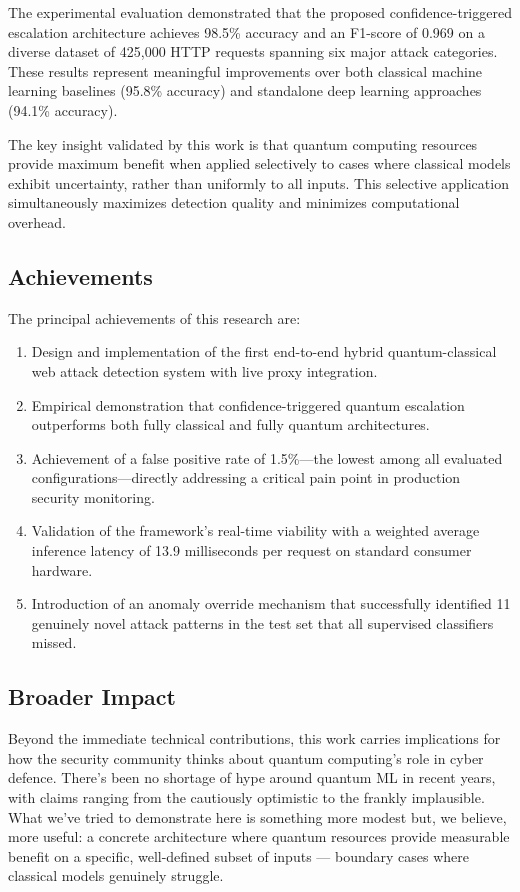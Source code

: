 \documentclass[journal,onecolumn]{IEEEtran}
\begin{document}
The experimental evaluation demonstrated that the proposed confidence-triggered escalation architecture achieves 98.5\% accuracy and an F1-score of 0.969 on a diverse dataset of 425,000 HTTP requests spanning six major attack categories. These results represent meaningful improvements over both classical machine learning baselines (95.8\% accuracy) and standalone deep learning approaches (94.1\% accuracy).

The key insight validated by this work is that quantum computing resources provide maximum benefit when applied selectively to cases where classical models exhibit uncertainty, rather than uniformly to all inputs. This selective application simultaneously maximizes detection quality and minimizes computational overhead.

\subsection{Achievements}
The principal achievements of this research are:

\begin{enumerate}
\item[(a)] Design and implementation of the first end-to-end hybrid quantum-classical web attack detection system with live proxy integration.

\item[(b)] Empirical demonstration that confidence-triggered quantum escalation outperforms both fully classical and fully quantum architectures.

\item[(c)] Achievement of a false positive rate of 1.5\%---the lowest among all evaluated configurations---directly addressing a critical pain point in production security monitoring.

\item[(d)] Validation of the framework's real-time viability with a weighted average inference latency of 13.9 milliseconds per request on standard consumer hardware.

\item[(e)] Introduction of an anomaly override mechanism that successfully identified 11 genuinely novel attack patterns in the test set that all supervised classifiers missed.
\end{enumerate}

\subsection{Broader Impact}
Beyond the immediate technical contributions, this work carries implications for how the security community thinks about quantum computing's role in cyber defence. There's been no shortage of hype around quantum ML in recent years, with claims ranging from the cautiously optimistic to the frankly implausible. What we've tried to demonstrate here is something more modest but, we believe, more useful: a concrete architecture where quantum resources provide measurable benefit on a specific, well-defined subset of inputs --- boundary cases where classical models genuinely struggle.
\end{document}
